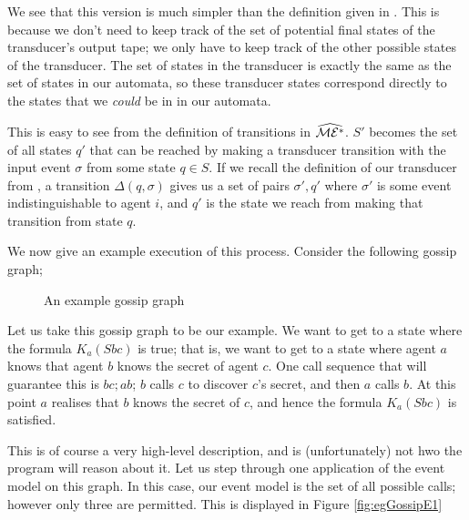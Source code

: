 \documentclass[12pt, a4paper]{article}
\begin{document}
We see that this version is much simpler than the definition given in
. This is because we don't need to keep track of the
set of potential final states of the transducer's output tape; we only have to
keep track of the other possible states of the transducer. The set of states in
the transducer is exactly the same as the set of states in our \mestar automata,
so these transducer states correspond directly to the states that we
\textit{could} be in in our \mestar automata.

This is easy to see from the definition of transitions in $\widehat{\mathcal{ME^\ast}}$.
$S'$ becomes the set of all states $q'$ that can be reached by making a
transducer transition with the input event $\sigma$ from some state $q \in S$.
If we recall the definition of our transducer from
, a transition $\Delta(q, \sigma)$ gives
us a set of pairs $\sigma', q'$ where $\sigma'$ is some event indistinguishable
to agent $i$, and $q'$ is the state we reach from making that transition from
state $q$. 

\bigskip \bigskip \bigskip

We now give an example execution of this process. Consider the following gossip
graph;

\begin{figure}[h]
  \centering
  \caption{An example gossip graph}
  \label{fig:egGossip}
\end{figure}

Let us take this gossip graph to be our example. We want to get to a state where
the formula $K_a (Sbc)$ is true; that is, we want to get to a state where agent
$a$ knows that agent $b$ knows the secret of agent $c$. One call sequence that
will guarantee this is $bc; ab$; $b$ calls $c$ to discover $c$'s secret, and
then $a$ calls $b$. At this point $a$ realises that $b$ knows the secret of $c$,
and hence the formula $K_a (Sbc)$ is satisfied.

This is of course a very high-level description, and is (unfortunately) not hwo
the program will reason about it. Let us step through one application of the
event model  on this graph. In this case, our event model  is the
set of all possible calls; however only three are permitted. This is displayed
in Figure \ref{fig:egGossipE1}
\end{document}
